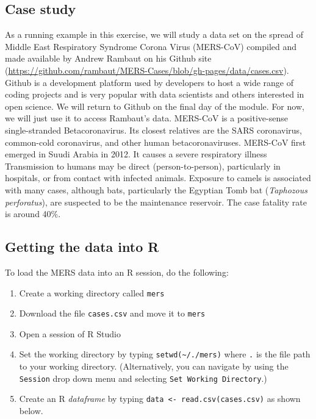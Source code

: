 \documentclass[]{article}
\providecommand{\tightlist}{%
  \setlength{\itemsep}{0pt}\setlength{\parskip}{0pt}}
\begin{document}
\hypertarget{case-study}{%
\subsection{Case study}\label{case-study}}

As a running example in this exercise, we will study a data set on the
spread of Middle East Respiratory Syndrome Corona Virus (MERS-CoV)
compiled and made available by Andrew Rambaut on his Github site
(\url{https://github.com/rambaut/MERS-Cases/blob/gh-pages/data/cases.csv}).
Github is a development platform used by developers to host a wide range
of coding projects and is very popular with data scientists and others
interested in open science. We will return to Github on the final day of
the module. For now, we will just use it to access Rambaut's data.
MERS-CoV is a positive-sense single-stranded Betacoronavirus. Its
closest relatives are the SARS coronavirus, common-cold coronavirus, and
other human betacoronaviruses. MERS-CoV first emerged in Suudi Arabia in
2012. It causes a severe respiratory illness Transmission to humans may
be direct (person-to-person), particularly in hospitals, or from contact
with infected animals. Exposure to camels is associated with many cases,
although bats, particularly the Egyptian Tomb bat (\emph{Taphozous
perforatus}), are suspected to be the maintenance reservoir. The case
fatality rate is around 40\%.

\hypertarget{getting-the-data-into-r}{%
\subsection{Getting the data into R}\label{getting-the-data-into-r}}

To load the MERS data into an R session, do the following:

\begin{enumerate}
\def\labelenumi{\arabic{enumi}.}
\tightlist
\item
  Create a working directory called \texttt{mers}
\item
  Download the file \texttt{cases.csv} and move it to \texttt{mers}
\item
  Open a session of R Studio
\item
  Set the working directory by typing
  \texttt{setwd(\textquotesingle{}\textasciitilde{}/./mers)} where
  \texttt{.} is the file path to your working directory. (Alternatively,
  you can navigate by using the \texttt{Session} drop down menu and
  selecting \texttt{Set\ Working\ Directory}.)
\item
  Create an R \emph{dataframe} by typing
  \texttt{data\ \textless{}-\ read.csv(\textquotesingle{}cases.csv\textquotesingle{})}
  as shown below.
\end{enumerate}
\end{document}
